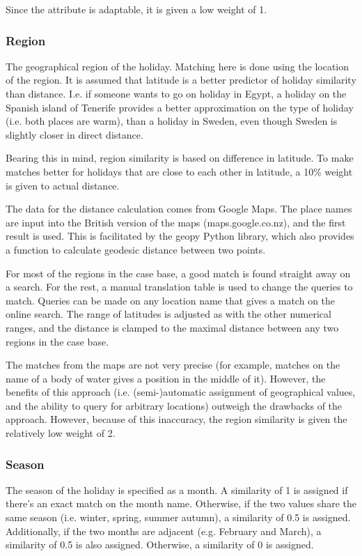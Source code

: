 \documentclass[11pt]{article}
\begin{document}
Since the attribute is adaptable, it is given a low weight of 1.

\subsubsection{Region}
The geographical region of the holiday. Matching here is done using
the location of the region. It is assumed that latitude is a better
predictor of holiday similarity than distance. I.e. if someone wants
to go on holiday in Egypt, a holiday on the Spanish island of Tenerife
provides a better approximation on the type of holiday (i.e. both
places are warm), than a holiday in Sweden, even though Sweden is
slightly closer in direct distance.

Bearing this in mind, region similarity is based on difference in
latitude. To make matches better for holidays that are close to each
other in latitude, a 10\% weight is given to actual distance.

The data for the distance calculation comes from Google Maps. The
place names are input into the British version of the maps
(maps.google.co.nz), and the first result is used. This is facilitated
by the geopy Python library, which also provides a function to
calculate geodesic distance between two points.

For most of the regions in the case base, a good match is found
straight away on a search. For the rest, a manual translation table is
used to change the queries to match. Queries can be made on any
location name that gives a match on the online search. The range of
latitudes is adjusted as with the other numerical ranges, and the
distance is clamped to the maximal distance between any two regions in
the case base.

The matches from the maps are not very precise (for example, matches
on the name of a body of water gives a position in the middle of it).
However, the benefits of this approach (i.e. (semi-)automatic
assignment of geographical values, and the ability to query for
arbitrary locations) outweigh the drawbacks of the approach. However,
because of this inaccuracy, the region similarity is given the
relatively low weight of 2.

\subsubsection{Season}
The season of the holiday is specified as a month. A similarity of 1
is assigned if there's an exact match on the month name. Otherwise, if
the two values share the same season (i.e. winter, spring, summer
autumn), a similarity of 0.5 is assigned. Additionally, if the two
months are adjacent (e.g. February and March), a similarity of 0.5 is
also assigned. Otherwise, a similarity of 0 is assigned.
\end{document}
